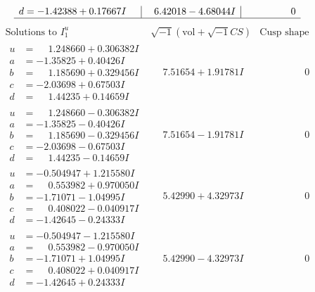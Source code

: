 \documentclass[1p]{elsarticle_modified}
\theoremstyle{definition}
\newcommand{\I}{\sqrt{-1}}
\begin{document}
$$\begin{array}{c|c|c}
\begin{aligned}
d &= -1.42388 + 0.17667 I\end{aligned}
 & \phantom{-}6.42018 - 4.68044 I & \phantom{-0.000000 } 0\\
 \hline 
 \end{array}$$\newpage$$\begin{array}{c|c|c}  
\text{Solutions to }I^u_{1}& \I (\text{vol} + \sqrt{-1}CS) & \text{Cusp shape}\\
 \hline 
\begin{aligned}
u &= \phantom{-}1.248660 + 0.306382 I \\
a &= -1.35825 + 0.40426 I \\
b &= \phantom{-}1.185690 + 0.329456 I \\
c &= -2.03698 + 0.67503 I \\
d &= \phantom{-}1.44235 + 0.14659 I\end{aligned}
 & \phantom{-}7.51654 + 1.91781 I & \phantom{-0.000000 } 0 \\ \hline\begin{aligned}
u &= \phantom{-}1.248660 - 0.306382 I \\
a &= -1.35825 - 0.40426 I \\
b &= \phantom{-}1.185690 - 0.329456 I \\
c &= -2.03698 - 0.67503 I \\
d &= \phantom{-}1.44235 - 0.14659 I\end{aligned}
 & \phantom{-}7.51654 - 1.91781 I & \phantom{-0.000000 } 0 \\ \hline\begin{aligned}
u &= -0.504947 + 1.215580 I \\
a &= \phantom{-}0.553982 + 0.970050 I \\
b &= -1.71071 - 1.04995 I \\
c &= \phantom{-}0.408022 - 0.040917 I \\
d &= -1.42645 - 0.24333 I\end{aligned}
 & \phantom{-}5.42990 + 4.32973 I & \phantom{-0.000000 } 0 \\ \hline\begin{aligned}
u &= -0.504947 - 1.215580 I \\
a &= \phantom{-}0.553982 - 0.970050 I \\
b &= -1.71071 + 1.04995 I \\
c &= \phantom{-}0.408022 + 0.040917 I \\
d &= -1.42645 + 0.24333 I\end{aligned}
 & \phantom{-}5.42990 - 4.32973 I & \phantom{-0.000000 } 0 \\ \hline\begin{aligned}

\end{aligned}
\end{array}$$
\end{document}
